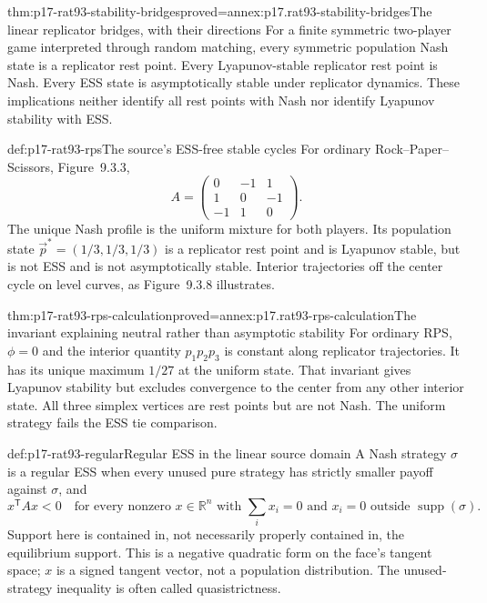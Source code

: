 \begin{hbtheorem}{thm:p17-rat93-stability-bridges}{proved=annex:p17.rat93-stability-bridges}{The linear replicator bridges, with their directions}
For a finite symmetric two-player game interpreted through random
matching, every symmetric population Nash state is a replicator rest
point. Every Lyapunov-stable replicator rest point is Nash. Every
ESS state is asymptotically stable under replicator dynamics.
These implications neither identify all rest points with Nash nor
identify Lyapunov stability with ESS.
\end{hbtheorem}

\begin{hbexample}{def:p17-rat93-rps}{The source's ESS-free stable cycles}
For ordinary Rock--Paper--Scissors, Figure~9.3.3,
\[
 A=\begin{pmatrix}0&-1&1\\1&0&-1\\-1&1&0\end{pmatrix}.
\]
The unique Nash profile is the uniform mixture for both players.
Its population state \(\vec p^*=(1/3,1/3,1/3)\) is a replicator
rest point and is Lyapunov stable, but is not ESS and is not
asymptotically stable. Interior trajectories off the center cycle
on level curves, as Figure~9.3.8 illustrates.
\end{hbexample}

\begin{hbtheorem}{thm:p17-rat93-rps-calculation}{proved=annex:p17.rat93-rps-calculation}{The invariant explaining neutral rather than asymptotic stability}
For ordinary RPS, \(\phi=0\) and the interior quantity
\(p_1p_2p_3\) is constant along replicator trajectories. It has its
unique maximum \(1/27\) at the uniform state. That invariant gives
Lyapunov stability but excludes convergence to the center from any
other interior state. All three simplex vertices are rest points
but are not Nash. The uniform strategy fails the ESS tie comparison.
\end{hbtheorem}

\begin{hbdefinition}{def:p17-rat93-regular}{Regular ESS in the linear source domain}
A Nash strategy \(\sigma\) is a regular ESS when every unused pure
strategy has strictly smaller payoff against \(\sigma\), and
\[
 x^{\mathsf T}Ax<0
 \quad\text{for every nonzero }x\in\mathbb R^n
 \text{ with }\sum_i x_i=0
 \text{ and }x_i=0\text{ outside }\operatorname{supp}(\sigma).
\]
Support here is contained in, not necessarily properly contained in,
the equilibrium support. This is a negative quadratic form on the
face's tangent space; \(x\) is a signed tangent vector, not a
population distribution. The unused-strategy inequality is often
called quasistrictness.
\end{hbdefinition}

